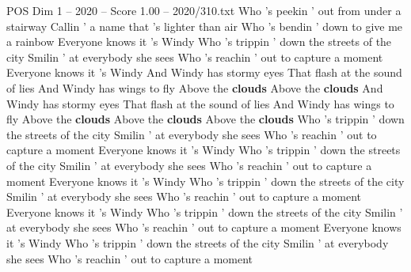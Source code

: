 \begin{textsample}{POS Dim 1 – 2020 – Score 1.00 – 2020/310.txt}  \label{ex:f1_pos_014}
Who 's peekin ' out from under a stairway Callin ' a name that 's lighter than air Who 's bendin ' down to give me a rainbow Everyone knows it 's Windy Who 's trippin ' down the streets of the city Smilin ' at everybody she sees Who 's reachin ' out to capture a moment Everyone knows it 's Windy And Windy has stormy eyes That flash at the sound of lies And Windy has wings to fly Above the \textbf{clouds} Above the \textbf{clouds} And Windy has stormy eyes That flash at the sound of lies And Windy has wings to fly Above the \textbf{clouds} Above the \textbf{clouds} Above the \textbf{clouds} Who 's trippin ' down the streets of the city Smilin ' at everybody she sees Who 's reachin ' out to capture a moment Everyone knows it 's Windy Who 's trippin ' down the streets of the city Smilin ' at everybody she sees Who 's reachin ' out to capture a moment Everyone knows it 's Windy Who 's trippin ' down the streets of the city Smilin ' at everybody she sees Who 's reachin ' out to capture a moment Everyone knows it 's Windy Who 's trippin ' down the streets of the city Smilin ' at everybody she sees Who 's reachin ' out to capture a moment Everyone knows it 's Windy Who 's trippin ' down the streets of the city Smilin ' at everybody she sees Who 's reachin ' out to capture a moment

\end{textsample}
